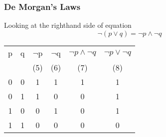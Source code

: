 \documentclass{beamer}
\begin{document}
\begin{frame}
\frametitle{De Morgan's Laws}
\Large
Looking at the righthand side of equation
\[  \neg (p \vee q) = \neg p \wedge \neg q\]
\begin{center}
\begin{tabular}{|c|c||c|c|c|c|}
  \hline
p	&	q	&	$\neg$p	&	$\neg$q	&	$\neg p \wedge \neg q$	&	$\neg p \vee \neg q$ \\ 
	&		&	(5)	&	(6)	&	(7)	&	(8)	\\
\hline
0	&	0	&	1	&	1	&	1	&	1	\\
0	&	1	&	1	&	0	&	0	&	1	\\
1	&	0	&	0	&	1	&	0	&	1	\\
1	&	1	&	0	&	0	&	0	&	0	\\
  \hline
\end{tabular}
\end{center}
\end{frame}
\end{document}
